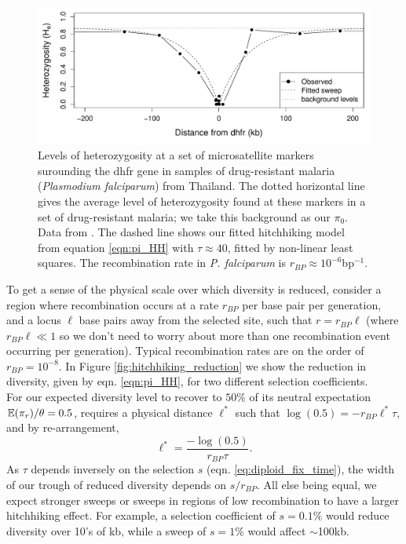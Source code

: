 \begin{figure}
\begin{center}
\includegraphics[width=\textwidth]{Journal_figs/recom_selection/malaria_sweep/dhfr_sweep.pdf}
\end{center}
\caption{Levels of heterozygosity at a set of microsatellite markers
  surounding the dhfr gene in samples of drug-resistant malaria ({\it Plasmodium falciparum}) from
  Thailand. The dotted horizontal line gives the average level of
  heterozygosity found at these markers in a set of drug-resistant
  malaria; we take this background as our $\pi_0$. Data from \citet{nash2005selection}. The dashed line shows
  our fitted hitchhiking model from equation \ref{eqn:pi_HH} with $\tau \approx 40$, fitted by
  non-linear least squares. The recombination rate in {\it P.
    falciparum} is $r_{BP}\approx 10^{-6}$bp$^{-1}$.} \label{fig:hitchhiking_malaria}
\end{figure}


To get a sense of the physical scale over which diversity is reduced,
consider a region where recombination occurs at a rate $r_{BP}$ per
base pair per generation, and a locus $ \ell $ base pairs away from the
selected site, such that $r=r_{BP } \ell $ (where $r_{BP}  \ell  \ll 1$ so we don't need to
worry about more than one recombination event occurring per
generation). Typical
recombination rates are on the order of $r_{BP} = 10^{-8}$. In Figure
\ref{fig:hitchhiking_reduction} we show the reduction in diversity,
given by eqn. \eqref{eqn:pi_HH}, for two different selection coefficients.\\ 

For our expected diversity level to recover to $50\%$ of
its neutral expectation $\mathbb{E}(\pi_r)/\theta=0.5$, requires a physical
distance $\ell^{*}$ such that $\log(0.5) = -r_{BP} \ell ^*\tau$, and by re-arrangement,
\begin{equation}
\ell^* = \frac{-\log(0.5)}{r_{BP} \tau }.
\end{equation}
As
$\tau$ depends inversely on the selection $s$ (eqn. \eqref{eq:diploid_fix_time}), the width of our trough of reduced diversity depends on $s/r_{BP}$.
All else being equal, we expect stronger sweeps or sweeps in regions of low
recombination to have a larger hitchhiking effect. For example, a selection coefficient of $s=0.1\%$ would reduce
diversity over 10's of kb, while a sweep of $s=1\%$ would affect
$\sim$100kb.   \\



